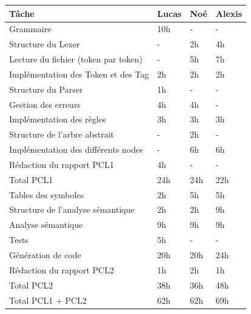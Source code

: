 \documentclass[french,a4paper]{article}
\begin{document}
    \begin{tabular}{@{}llll@{}}
        \toprule
        Tâche & Lucas & Noé & Alexis \\ \midrule
        Grammaire & 10h & - & - \\
        Structure du Lexer & - & 2h & 4h \\
        Lecture du fichier (token par token) & - & 5h & 7h \\
        Implémentation des Token et des Tag & 2h & 2h & 2h \\
        Structure du Parser & 1h & - & - \\
        Gestion des erreurs & 4h & 4h & - \\
        Implémentation des règles & 3h & 3h & 3h \\
        Structure de l'arbre abstrait & - & 2h & - \\
        Implémentation des différents nodes & - & 6h & 6h \\
        Rédaction du rapport PCL1 & 4h & - & - \\
        \midrule
        Total PCL1 & 24h & 24h & 22h \\ \bottomrule
        Tables des symboles & 2h & 5h & 5h \\
        Structure de l'analyse sémantique & 2h & 2h & 9h \\
        Analyse sémantique & 9h & 9h & 9h \\
        Tests & 5h & - & - \\
        Génération de code & 20h & 20h & 24h \\
        Rédaction du rapport PCL2 & 1h & 2h & 1h \\
        \midrule
        Total PCL2 & 38h & 36h & 48h \\ \bottomrule
        \midrule
        Total PCL1 + PCL2 & 62h & 62h & 69h \\ \bottomrule

    \end{tabular}
\end{document}
